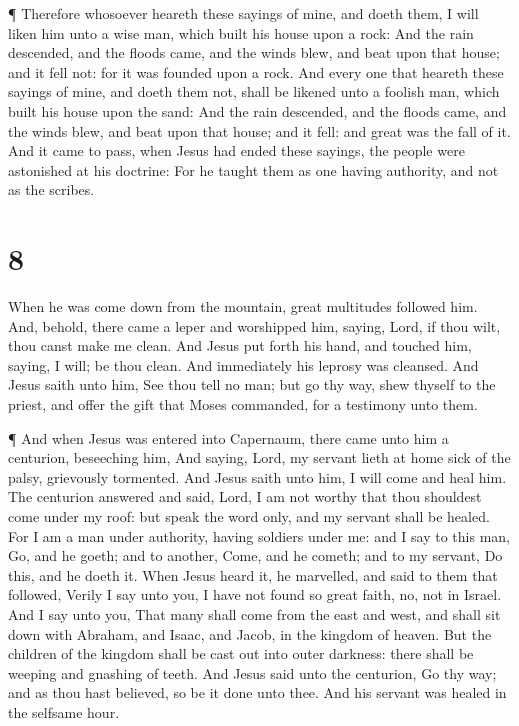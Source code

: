  ¶ Therefore whosoever heareth these sayings of mine, and
doeth them, I will liken him unto a wise man, which built his house upon
a rock:  And the rain descended, and the floods came, and
the winds blew, and beat upon that house; and it fell not: for it was
founded upon a rock.  And every one that heareth these
sayings of mine, and doeth them not, shall be likened unto a foolish
man, which built his house upon the sand:  And the rain
descended, and the floods came, and the winds blew, and beat upon that
house; and it fell: and great was the fall of it.  And it
came to pass, when Jesus had ended these sayings, the people were
astonished at his doctrine:  For he taught them as one
having authority, and not as the scribes.

\hypertarget{section-7}{%
\section{8}\label{section-7}}

 When he was come down from the mountain, great multitudes
followed him.  And, behold, there came a leper and
worshipped him, saying, Lord, if thou wilt, thou canst make me clean.
 And Jesus put forth his hand, and touched him, saying, I
will; be thou clean. And immediately his leprosy was cleansed.
 And Jesus saith unto him, See thou tell no man; but go thy
way, shew thyself to the priest, and offer the gift that Moses
commanded, for a testimony unto them.

 ¶ And when Jesus was entered into Capernaum, there came
unto him a centurion, beseeching him,  And saying, Lord, my
servant lieth at home sick of the palsy, grievously tormented.
 And Jesus saith unto him, I will come and heal him.
 The centurion answered and said, Lord, I am not worthy that
thou shouldest come under my roof: but speak the word only, and my
servant shall be healed.  For I am a man under authority,
having soldiers under me: and I say to this man, Go, and he goeth; and
to another, Come, and he cometh; and to my servant, Do this, and he
doeth it.  When Jesus heard it, he marvelled, and said to
them that followed, Verily I say unto you, I have not found so great
faith, no, not in Israel.  And I say unto you, That many
shall come from the east and west, and shall sit down with Abraham, and
Isaac, and Jacob, in the kingdom of heaven.  But the
children of the kingdom shall be cast out into outer darkness: there
shall be weeping and gnashing of teeth.  And Jesus said
unto the centurion, Go thy way; and as thou hast believed, so be it done
unto thee. And his servant was healed in the selfsame hour.

